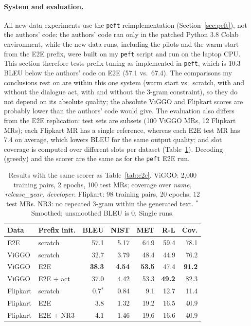 \documentclass[11pt]{article}
\begin{document}
\paragraph{System and evaluation.} All new-data experiments use the \texttt{peft} reimplementation (Section~\ref{sec:peft}), not the authors' code: the authors' code ran only in the patched Python 3.8 Colab environment, while the new-data runs, including the pilots and the warm start from the E2E prefix, were built on my \texttt{peft} script and run on the laptop CPU. This section therefore tests prefix-tuning as implemented in \texttt{peft}, which is 10.3 BLEU below the authors' code on E2E (57.1 vs.\ 67.4). The comparisons my conclusions rest on are within this one system (warm start vs.\ scratch, with and without the dialogue act, with and without the 3-gram constraint), so they do not depend on its absolute quality; the absolute ViGGO and Flipkart scores are probably lower than the authors' code would give. The evaluation also differs from the E2E replication: test sets are subsets (100 ViGGO MRs, 12 Flipkart MRs); each Flipkart MR has a single reference, whereas each E2E test MR has 7.4 on average, which lowers BLEU for the same output quality; and slot coverage is computed over different slots per dataset (Table~\ref{tab:new}). Decoding (greedy) and the scorer are the same as for the \texttt{peft} E2E run.

\begin{table}[t]
\centering\small
\setlength{\tabcolsep}{3pt}
\begin{tabular}{@{}llrrrrr@{}}
\toprule
Data & Prefix init. & BLEU & NIST & MET & R-L & Cov. \\
\midrule
E2E & scratch & 57.1 & 5.17 & 64.9 & 59.4 & 78.1 \\
\midrule
ViGGO & scratch & 32.7 & 3.79 & 48.4 & 44.9 & 76.2 \\
ViGGO & E2E & \textbf{38.3} & \textbf{4.54} & \textbf{53.5} & 47.4 & \textbf{91.2} \\
ViGGO & E2E + act & 37.0 & 4.42 & 53.3 & \textbf{49.2} & 82.3 \\
\midrule
Flipkart & scratch & 0.7$^\ast$ & 0.84 & 9.1 & 12.7 & 11.4 \\
Flipkart & E2E & 3.8 & 1.32 & 19.2 & 16.5 & 40.9 \\
Flipkart & E2E + NR3 & 4.1 & 1.46 & 19.6 & 16.6 & 40.9 \\
\bottomrule
\end{tabular}
\caption{Results with the same scorer as Table~\ref{tab:e2e}. ViGGO: 2,000 training pairs, 2 epochs, 100 test MRs; coverage over \textit{name, release\_year, developer}. Flipkart: 98 training pairs, 20 epochs, 12 test MRs. NR3: no repeated 3-gram within the generated text. $^\ast$Smoothed; unsmoothed BLEU is 0. Single runs.}
\label{tab:new}
\end{table}
\end{document}
